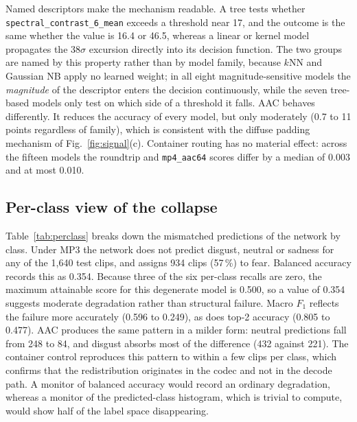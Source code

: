 \documentclass[lettersize,journal]{IEEEtran}
\newcommand{\ttf}[1]{\texttt{\footnotesize #1}}
\begin{document}
Named descriptors make the mechanism readable. A tree tests whether
\ttf{spectral\_contrast\_6\_mean} exceeds a threshold near 17, and the outcome
is the same whether the value is 16.4 or 46.5, whereas a linear or kernel model
propagates the $38\sigma$ excursion directly into its decision function. The
two groups are named by this property rather than by model family, because
$k$NN and Gaussian NB apply no learned weight; in all eight magnitude-sensitive
models the \emph{magnitude} of the descriptor enters the decision continuously,
while the seven tree-based models only test on which side of a threshold it
falls. AAC behaves differently. It reduces the accuracy of every model, but
only moderately (0.7 to 11 points regardless of family), which is consistent
with the diffuse padding mechanism of Fig.~\ref{fig:signal}(c). Container
routing has no material effect: across the fifteen models the roundtrip and
\ttf{mp4\_aac64} scores differ by a median of 0.003 and at most 0.010.

\subsection{Per-class view of the collapse}\label{sec:perclass}
Table~\ref{tab:perclass} breaks down the mismatched predictions of the network
by class. Under MP3 the network does not predict disgust, neutral or sadness
for any of the 1{,}640 test clips, and assigns 934 clips (57\,\%) to fear.
Balanced accuracy records this as 0.354. Because three of the six per-class
recalls are zero, the maximum attainable score for this degenerate model is
0.500, so a value of 0.354 suggests moderate degradation rather than structural
failure. Macro $F_1$ reflects the failure more accurately (0.596 to 0.249), as
does top-2 accuracy (0.805 to 0.477). AAC produces the same pattern in a milder
form: neutral predictions fall from 248 to 84, and disgust absorbs most of the
difference (432 against 221). The container control reproduces this pattern to
within a few clips per class, which confirms that the redistribution originates
in the codec and not in the decode path. A monitor of balanced accuracy would
record an ordinary degradation, whereas a monitor of the predicted-class
histogram, which is trivial to compute, would show half of the label space
disappearing.
\end{document}
